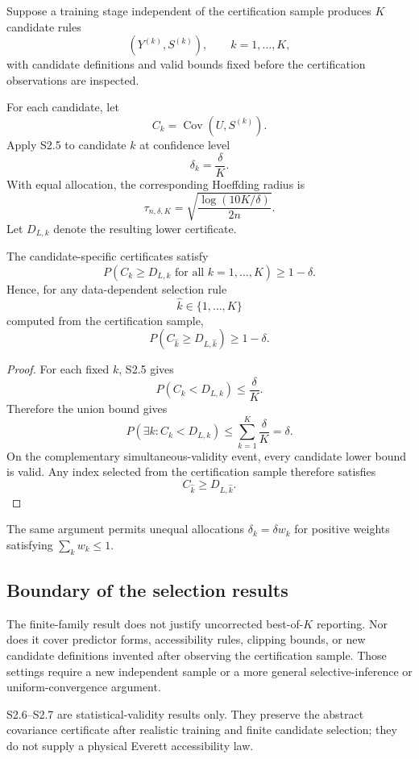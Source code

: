 Suppose a training stage independent of the certification sample produces $K$ candidate rules
\[
(Y^{(k)},S^{(k)}),
\qquad
k=1,\ldots,K,
\]
with candidate definitions and valid bounds fixed before the certification observations are inspected.

For each candidate, let
\[
C_k=\operatorname{Cov}(U,S^{(k)}).
\]
Apply S2.5 to candidate $k$ at confidence level
\[
\delta_k=\frac{\delta}{K}.
\]
With equal allocation, the corresponding Hoeffding radius is
\[
\tau_{n,\delta,K}
=
\sqrt{\frac{\log(10K/\delta)}{2n}}.
\]
Let $D_{L,k}$ denote the resulting lower certificate.

\begin{corollary}
The candidate-specific certificates satisfy
\[
P\!\left(
C_k\ge D_{L,k}
\text{ for all }k=1,\ldots,K
\right)
\ge1-\delta.
\]
Hence, for any data-dependent selection rule
\[
\widehat k
\in\{1,\ldots,K\}
\]
computed from the certification sample,
\[
P\!\left(
C_{\widehat k}
\ge
D_{L,\widehat k}
\right)
\ge1-\delta.
\]
\end{corollary}

\begin{proof}
For each fixed $k$, S2.5 gives
\[
P(C_k<D_{L,k})\le\frac{\delta}{K}.
\]
Therefore the union bound gives
\[
P\!\left(\exists k: C_k<D_{L,k}\right)
\le
\sum_{k=1}^K\frac{\delta}{K}
=
\delta.
\]
On the complementary simultaneous-validity event, every candidate lower bound is valid. Any index selected from the certification sample therefore satisfies
\[
C_{\widehat k}\ge D_{L,\widehat k}.
\]
\end{proof}

The same argument permits unequal allocations $\delta_k=\delta w_k$ for positive weights satisfying $\sum_k w_k\le1$.

\subsection{Boundary of the selection results}

The finite-family result does not justify uncorrected best-of-$K$ reporting. Nor does it cover predictor forms, accessibility rules, clipping bounds, or new candidate definitions invented after observing the certification sample. Those settings require a new independent sample or a more general selective-inference or uniform-convergence argument.

S2.6--S2.7 are statistical-validity results only. They preserve the abstract covariance certificate after realistic training and finite candidate selection; they do not supply a physical Everett accessibility law.
